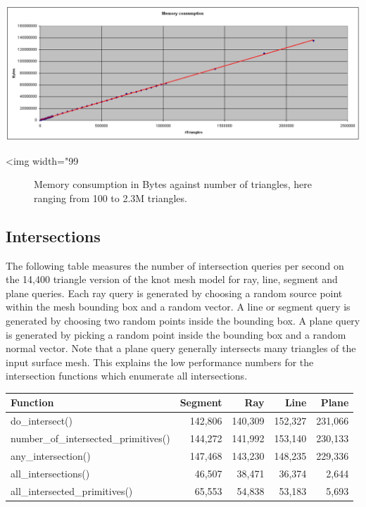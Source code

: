 \begin{center}
    \label{fig:AABB-tree-memory}
    \begin{ccTexOnly}
      \includegraphics[width=1.0\textwidth]{AABB_tree/figs/memory}
    \end{ccTexOnly}
    \begin{ccHtmlOnly}
        <img width="99%
    \end{ccHtmlOnly}
    \begin{figure}[h]
        \caption{Memory consumption in Bytes against number of triangles, here
                 ranging from 100 to 2.3M triangles.}
    \end{figure}
\end{center}



\subsection{Intersections}

The following table measures the number of intersection queries per second on the 14,400 triangle version of the knot mesh model for ray, line, segment and plane queries. Each ray query is generated by choosing a random source point within the mesh bounding box and a random vector. A line or segment query is generated by choosing two random points inside the bounding box. A plane query is generated by picking a random point inside the bounding box and a random normal vector. Note that a plane query generally intersects many triangles of the input surface mesh. This explains the low performance numbers for the intersection functions which enumerate all intersections.

\begin{tabular}{|l|r|r|r|r|}
  \label{table:AABB-tree-intersections}
  \hline
  Function                              & Segment &     Ray &    Line &   Plane \\
  \hline
  do\_intersect()                       & 142,806 & 140,309 & 152,327 & 231,066 \\
  number\_of\_intersected\_primitives() & 144,272 & 141,992 & 153,140 & 230,133 \\
  any\_intersection()                   & 147,468 & 143,230 & 148,235 & 229,336 \\
  all\_intersections()                  &  46,507 &  38,471 &  36,374 &   2,644 \\
  all\_intersected\_primitives()        &  65,553 &  54,838 &  53,183 &   5,693 \\
  \hline
\end{tabular}

